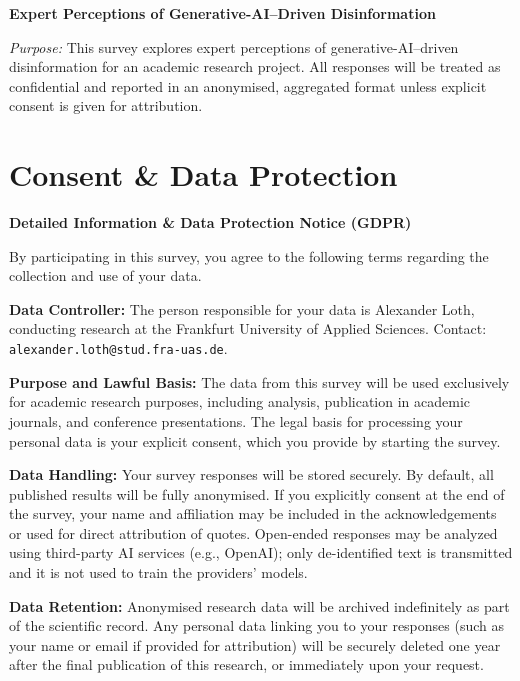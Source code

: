 
\noindent\textbf{\Large Expert Perceptions of Generative-AI--Driven Disinformation}

\medskip
\noindent\textit{Purpose:} This survey explores expert perceptions of generative-AI--driven disinformation for an academic research project. All responses will be treated as confidential and reported in an anonymised, aggregated format unless explicit consent is given for attribution.

\section*{Consent \& Data Protection}

\noindent\textbf{Detailed Information \& Data Protection Notice (GDPR)}

\medskip
\noindent By participating in this survey, you agree to the following terms regarding the collection and use of your data.

\medskip
\noindent\textbf{Data Controller:} The person responsible for your data is Alexander Loth, conducting research at the Frankfurt University of Applied Sciences. Contact: \texttt{alexander.loth@stud.fra-uas.de}.

\medskip
\noindent\textbf{Purpose and Lawful Basis:} The data from this survey will be used exclusively for academic research purposes, including analysis, publication in academic journals, and conference presentations. The legal basis for processing your personal data is your explicit consent, which you provide by starting the survey.

\medskip
\noindent\textbf{Data Handling:} Your survey responses will be stored securely. By default, all published results will be fully anonymised. If you explicitly consent at the end of the survey, your name and affiliation may be included in the acknowledgements or used for direct attribution of quotes. Open-ended responses may be analyzed using third-party AI services (e.g., OpenAI); only de-identified text is transmitted and it is not used to train the providers' models.

\medskip
\noindent\textbf{Data Retention:} Anonymised research data will be archived indefinitely as part of the scientific record. Any personal data linking you to your responses (such as your name or email if provided for attribution) will be securely deleted one year after the final publication of this research, or immediately upon your request.

